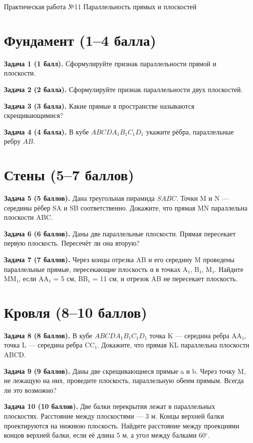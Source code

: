 \documentclass{umk-matematika}
\begin{document}
\maketitlepage
    {Практическая работа №11}
    {Параллельность прямых и плоскостей}
    {}

\section{Фундамент (1--4 балла)}

\textbf{Задача 1 (1 балл).} Сформулируйте признак параллельности прямой и плоскости.

\textbf{Задача 2 (2 балла).} Сформулируйте признак параллельности двух плоскостей.

\textbf{Задача 3 (3 балла).} Какие прямые в пространстве называются скрещивающимися?

\textbf{Задача 4 (4 балла).} В кубе $ABCDA_1B_1C_1D_1$ укажите рёбра, параллельные ребру $AB$.

\section{Стены (5--7 баллов)}

\textbf{Задача 5 (5 баллов).} Дана треугольная пирамида $SABC$. Точки M и N — середины рёбер SA и SB соответственно. Докажите, что прямая MN параллельна плоскости ABC.

\textbf{Задача 6 (6 баллов).} Даны две параллельные плоскости. Прямая пересекает первую плоскость. Пересечёт ли она вторую?

\textbf{Задача 7 (7 баллов).} Через концы отрезка AB и его середину M проведены параллельные прямые, пересекающие плоскость α в точках A₁, B₁, M₁. Найдите MM₁, если AA₁ = 5 см, BB₁ = 11 см, и отрезок AB не пересекает плоскость.

\section{Кровля (8--10 баллов)}

\textbf{Задача 8 (8 баллов).} В кубе $ABCDA_1B_1C_1D_1$ точка K — середина ребра AA₁, точка L — середина ребра CC₁. Докажите, что прямая KL параллельна плоскости ABCD.

\textbf{Задача 9 (9 баллов).} Даны две скрещивающиеся прямые a и b. Через точку M, не лежащую на них, проведите плоскость, параллельную обеим прямым. Всегда ли это возможно?

\textbf{Задача 10 (10 баллов).} Две балки перекрытия лежат в параллельных плоскостях. Расстояние между плоскостями — 3 м. Концы верхней балки проектируются на нижнюю плоскость. Найдите расстояние между проекциями концов верхней балки, если её длина 5 м, а угол между балками 60$^\circ$.
\end{document}
